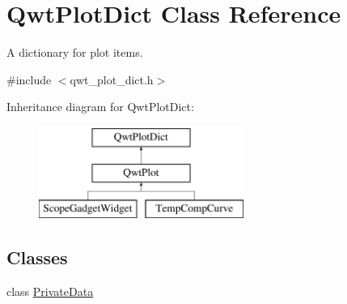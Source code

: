 \hypertarget{class_qwt_plot_dict}{\section{Qwt\-Plot\-Dict Class Reference}
\label{class_qwt_plot_dict}
}


A dictionary for plot items.  




{\ttfamily \#include $<$qwt\-\_\-plot\-\_\-dict.\-h$>$}

Inheritance diagram for Qwt\-Plot\-Dict\-:\begin{figure}[H]
\begin{center}
\leavevmode
\includegraphics[height=3.000000cm]{class_qwt_plot_dict}
\end{center}
\end{figure}
\subsection*{Classes}
\begin{DoxyCompactItemize}
\item 
class \hyperlink{class_qwt_plot_dict_1_1_private_data}{Private\-Data}
\end{DoxyCompactItemize}
